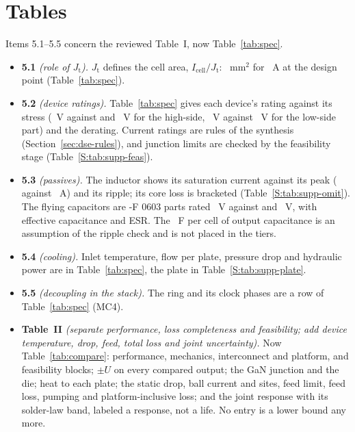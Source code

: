 \documentclass[10pt]{article}
\begin{document}
\section*{Tables}
Items 5.1--5.5 concern the reviewed Table~I, now Table~\ref{tab:spec}.
\begin{itemize}
\item \textbf{5.1} \emph{(role of $J_{\mathrm{t}}$).} $J_{\mathrm{t}}$ defines the cell area,
$I_{\mathrm{cell}}/J_{\mathrm{t}}$: \FrConvCellArea~mm$^2$ for \FrConvIcell~A at the design point
(Table~\ref{tab:spec}).
\item \textbf{5.2} \emph{(device ratings).} Table~\ref{tab:spec} gives each device's rating against its
stress (\FrConvHsVmax~V against \FrConvHsVsone{} and \FrConvHsVstack~V for the high-side,
\FrConvLsVmax~V against \FrConvLsVs~V for the low-side part) and the derating. Current ratings are
rules of the synthesis (Section~\ref{sec:dse-rules}), and junction limits are checked by the
feasibility stage (Table~\ref{S:tab:supp-feas}).
\item \textbf{5.3} \emph{(passives).} The inductor shows its saturation current against its peak
(\FrConvIndIsat{} against \FrConvIndIpk~A) and its ripple; its core loss is bracketed
(Table~\ref{S:tab:supp-omit}). The flying capacitors are \FrConvCapCnom-\textmu F 0603 parts rated
\FrConvCapVmax~V against \FrConvCapVone{} and \FrConvCapVtwo~V, with effective capacitance and ESR.
The \FrConvCout~\textmu F per cell of output capacitance is an assumption of the ripple check and is
not placed in the tiers.
\item \textbf{5.4} \emph{(cooling).} Inlet temperature, flow per plate, pressure drop and hydraulic
power are in Table~\ref{tab:spec}, the plate in Table~\ref{S:tab:supp-plate}.
\item \textbf{5.5} \emph{(decoupling in the stack).} The ring and its clock phases are a row of
Table~\ref{tab:spec} (MC4).
\item \textbf{Table~II} \emph{(separate performance, loss completeness and feasibility; add device
temperature, drop, feed, total loss and joint uncertainty).} Now Table~\ref{tab:compare}: performance,
mechanics, interconnect and platform, and feasibility blocks; $\pm U$ on every compared output; the
GaN junction and the die; heat to each plate; the static drop, ball current and sites, feed limit,
feed loss, pumping and platform-inclusive loss; and the joint response with its solder-law band,
labeled a response, not a life. No entry is a lower bound any more.
\end{itemize}
\end{document}
